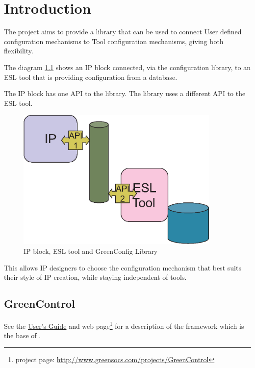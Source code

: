 
\cleardoublepage
\chapter{Introduction}

The \GreenConfig project aims to provide a library that can be used to connect User defined configuration mechanisms to Tool configuration mechanisms, giving both flexibility. 

The diagram \ref{fig:config} shows an IP block connected, via the configuration library, to an ESL tool that is providing configuration from a database. 

The IP block has one API to the library. The library uses a different API to the ESL tool. 

\begin{figure}[htbp]
	\centerline{
		\includegraphics[width=10cm]{config.eps}} 
	\caption{IP block, ESL tool and GreenConfig Library}
	\label{fig:config}
\end{figure}

This allows IP designers to choose the configuration mechanism that best suits their style of IP creation, while staying independent of tools.  

\section{GreenControl}
See the \hypertarget{GCUsersGuide}{\href{http://www.greensocs.com/projects/GreenControl/docs/GCUsersGuide}{\GreenControl User's Guide}} and web page\footnote{\GreenControl project page:  \href{http://www.greensocs.com/projects/GreenControl}{http://www.greensocs.com/projects/GreenControl}} for a description of the \GreenControl framework which is the base of \GreenConfig.

